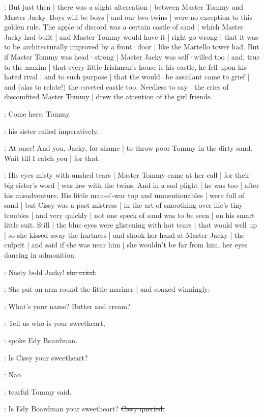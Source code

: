 :
But just then |
there was a slight altercation |%
between Master Tommy and Master Jacky.
Boys will be boys |
and our two twins |
were no exception to this golden rule.
The apple of discord was a certain castle of sand |
which Master Jacky had built |
and Master Tommy would have it |
right go wrong |
that it was to be architecturally improved
by a front·door |
like the Martello tower had.
But if Master Tommy was head·strong |
Master Jacky was self·willed too |
and,
true to the maxim |
that every little Irishman's house is his castle,
he fell upon his hated rival |
and to such purpose |
that the would·be assailant came to grief |
and
(alas to relate!)
the coveted castle too.
Needless to say |
the cries of discomfited Master Tommy |
drew the attention of the girl friends.%

\cissy:
Come here,
Tommy.

:
his sister called imperatively.

\cissy:
At once!
And you,
Jacky,
for shame |
to throw poor Tommy in the dirty sand.
Wait till I catch you |
for that.

:
His eyes misty with unshed tears |
Master Tommy came at her call |
for their big sister's word |
was law with the twins.
And in a sad plight |
he was too |
after his misadventure.
His little man-o'-war top and unmentionables |
were full of sand |
but Cissy was a past mistress |
in the art of smoothing over life's tiny troubles |
and very quickly |
not one speck of sand was to be seen |
on his smart little suit.
Still |
the blue eyes were glistening with hot tears |
that would well up |
so she kissed away
the hurtness |
and shook her hand at Master Jacky |
the culprit |
and said if she was near him |
she wouldn't be far from him,
her eyes dancing in admonition.

\cissy:
Nasty bold Jacky!
\sout{she cried.}

:
She put an arm round the little mariner |
and coaxed winningly:

\cissy:
What's your name?
Butter and cream?

\edy:
Tell us who is your sweetheart,

:
spoke Edy Boardman.

\edy:
Is Cissy your sweetheart?

\tommy:
Nao
\stage{[tearfully]}

:
tearful Tommy said.

\cissy:
Is Edy Boardman your sweetheart?
\sout{Cissy queried.}

